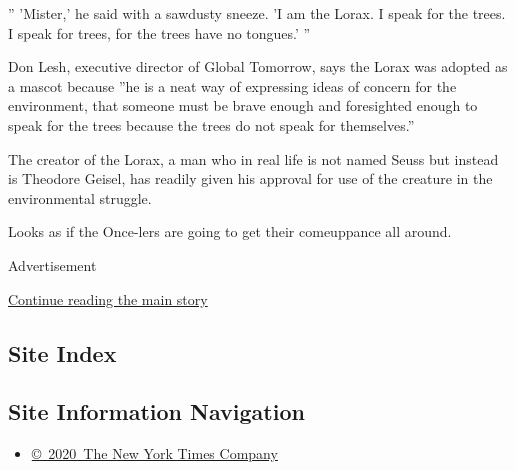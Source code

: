 '' 'Mister,' he said with a sawdusty sneeze. 'I am the Lorax. I speak
for the trees. I speak for trees, for the trees have no tongues.' ''

Don Lesh, executive director of Global Tomorrow, says the Lorax was
adopted as a mascot because ''he is a neat way of expressing ideas of
concern for the environment, that someone must be brave enough and
foresighted enough to speak for the trees because the trees do not speak
for themselves.''

The creator of the Lorax, a man who in real life is not named Seuss but
instead is Theodore Geisel, has readily given his approval for use of
the creature in the environmental struggle.

Looks as if the Once-lers are going to get their comeuppance all around.

Advertisement

\protect\hyperlink{after-bottom}{Continue reading the main story}

\hypertarget{site-index}{%
\subsection{Site Index}\label{site-index}}

\hypertarget{site-information-navigation}{%
\subsection{Site Information
Navigation}\label{site-information-navigation}}

\begin{itemize}
\tightlist
\item
  \href{https://help.nytimes.com/hc/en-us/articles/115014792127-Copyright-notice}{©~2020~The
  New York Times Company}
\end{itemize}

